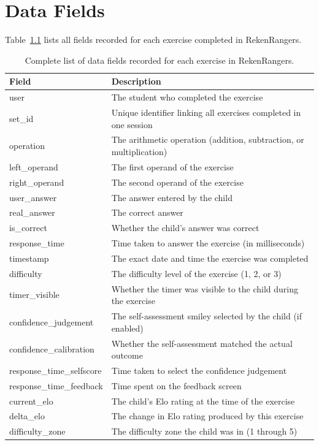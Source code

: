 \chapter{Data Fields}
\label{app:data-fields}

Table~\ref{tab:data-fields} lists all fields recorded for each exercise completed in RekenRangers.

\begin{table}[ht]
\centering
\begin{tabular}{lp{9cm}}
\toprule
Field & Description \\
\midrule
user & The student who completed the exercise \\
set\_id & Unique identifier linking all exercises completed in one session \\
operation & The arithmetic operation (addition, subtraction, or multiplication) \\
left\_operand & The first operand of the exercise \\
right\_operand & The second operand of the exercise \\
user\_answer & The answer entered by the child \\
real\_answer & The correct answer \\
is\_correct & Whether the child's answer was correct \\
response\_time & Time taken to answer the exercise (in milliseconds) \\
timestamp & The exact date and time the exercise was completed \\
difficulty & The difficulty level of the exercise (1, 2, or 3) \\
timer\_visible & Whether the timer was visible to the child during the exercise \\
confidence\_judgement & The self-assessment smiley selected by the child (if enabled) \\
confidence\_calibration & Whether the self-assessment matched the actual outcome \\
response\_time\_selfscore & Time taken to select the confidence judgement \\
response\_time\_feedback & Time spent on the feedback screen \\
current\_elo & The child's Elo rating at the time of the exercise \\
delta\_elo & The change in Elo rating produced by this exercise \\
difficulty\_zone & The difficulty zone the child was in (1 through 5) \\
\bottomrule
\end{tabular}
\caption{Complete list of data fields recorded for each exercise in RekenRangers.}
\label{tab:data-fields}
\end{table}